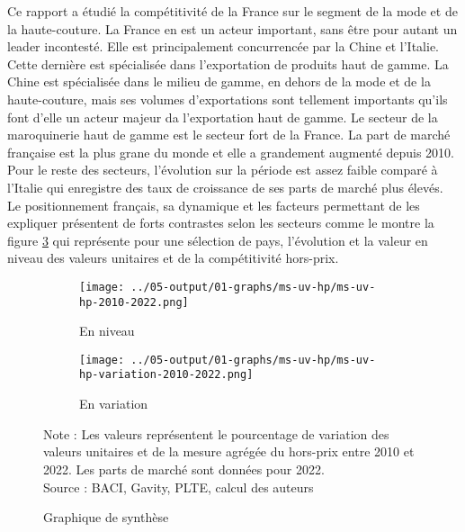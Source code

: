 \documentclass[french,10pt,a4paper]{article}
\begin{document}
Ce rapport a étudié la compétitivité de la France sur le segment de la mode et de la haute-couture. La France en est un  acteur important, sans être pour autant un leader incontesté. Elle est principalement concurrencée par la Chine et l'Italie. Cette dernière est spécialisée dans l'exportation de produits haut de gamme. La Chine est spécialisée dans le milieu de gamme, en dehors de la mode et de la haute-couture, mais ses volumes d'exportations sont tellement importants qu'ils font d'elle un acteur majeur da l'exportation haut de gamme. Le secteur de la maroquinerie haut de gamme est le secteur fort de la France. La part de marché française est la plus grane du monde et elle a grandement augmenté depuis 2010. Pour le reste des secteurs, l'évolution sur la période est assez faible comparé à l'Italie qui enregistre des taux de croissance de ses parts de marché plus élevés. Le positionnement français, sa dynamique et les facteurs permettant de les expliquer présentent de forts contrastes selon les secteurs comme le montre la figure \ref{fig:graph-synthese} qui représente pour une sélection de pays, l'évolution et la valeur en niveau des valeurs unitaires et de la compétitivité hors-prix. 

\begin{figure}[!h]
  \centering
  \begin{subfigure}{\textwidth}
    \centering    \texttt{[image: ../05-output/01-graphs/ms-uv-hp/ms-uv-hp-2010-2022.png]}
    \caption{En niveau}
    \label{fig:ms-uv-hp}
  \end{subfigure}
  \vspace{0.5cm}
  \begin{subfigure}{\textwidth}
    \centering \texttt{[image: ../05-output/01-graphs/ms-uv-hp/ms-uv-hp-variation-2010-2022.png]}
 \caption{En variation}
 \label{fig:ms-uv-hp-variation}
  \end{subfigure}
  \captionsetup{justification=justified, singlelinecheck=false, font=small}
  \caption*{Note : Les valeurs représentent le pourcentage de variation des valeurs unitaires et de la mesure agrégée du hors-prix entre 2010 et 2022. Les parts de marché sont données pour 2022.\\
  Source : BACI, Gavity, PLTE, calcul des auteurs}
  \captionsetup{justification=centering, singlelinecheck=true, font=normalsize}
  \caption{Graphique de synthèse}
  \label{fig:graph-synthese}
\end{figure}

\bigskip
\end{document}
